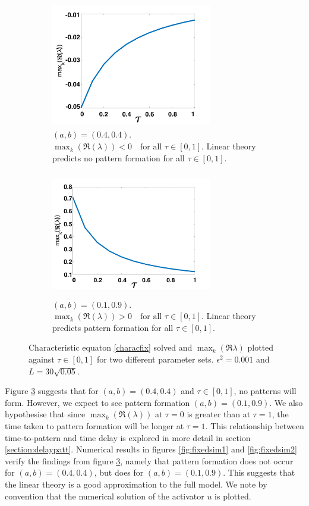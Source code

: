 \begin{figure}[H]
    \centering
    \begin{subfigure}[b]{0.45\textwidth}
        \centering
        \includegraphics[width=7cm,height = 5.5cm]{disp1.png}
        \caption{$(a,b)=(0.4,0.4)$. $\max_k(\Re(\lambda))<0 \quad \text{for all }\tau\in[0,1]$. Linear theory predicts no pattern formation for all $\tau\in[0,1]$. }
        \label{}
    \end{subfigure}
    \hfill
    \begin{subfigure}[b]{0.45\textwidth}
        \centering
        \includegraphics[width=7cm,height = 5.5cm]{disp2.png}
        \caption{$(a,b)=(0.1,0.9)$. $\max_k(\Re(\lambda))>0 \quad \text{for all }\tau\in[0,1]$. Linear theory predicts pattern formation for all $\tau\in[0, 1]$.}
        \label{}
    \end{subfigure}
    \caption{Characteristic equaton \eqref{characfix} solved and $\max_k(\Re{\lambda})$ plotted against $\tau\in[0,1]$ for two different parameter sets. $\epsilon^2=0.001$ and $L=30\sqrt{0.05}$.}
    \label{fig:dispfixed}
\end{figure}
Figure \ref{fig:dispfixed} suggests that for $(a,b)=(0.4,0.4)$ and $\tau\in[0,1]$, no patterns will form. However, we expect to see pattern formation $(a,b)=(0.1,0.9)$. We also hypothesise that since $\max_k(\Re(\lambda))$ at $\tau=0$ is greater than at $\tau=1$, the time taken to pattern formation will be longer at $\tau=1$. This relationship between time-to-pattern and time delay is explored in more detail in section \ref{section:delaypatt}. Numerical results in figures \ref{fig:fixedsim1} and \ref{fig:fixedsim2} verify the findings from figure \ref{fig:dispfixed}, namely that pattern formation does not occur for $(a,b)=(0.4,0.4)$, but does for $(a,b)=(0.1,0.9)$.  This suggests that the linear theory is a good approximation to the full model. We note by convention that the numerical solution of the activator $u$ is plotted.
